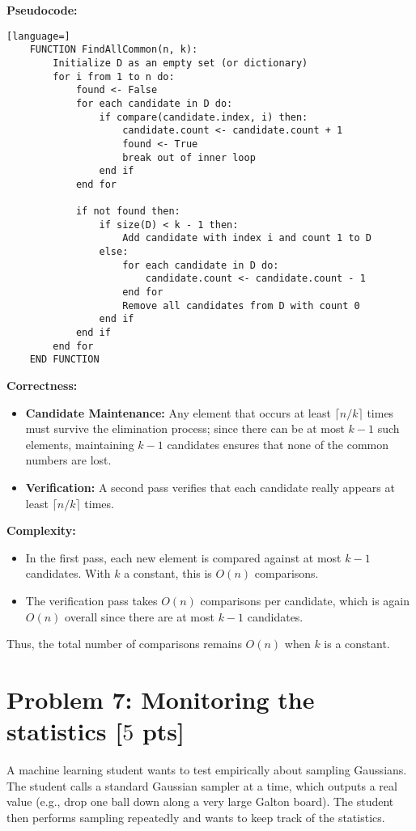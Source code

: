 \documentclass[letterpaper, 11pt]{article}
\newcommand{\1}{\mathds{1}}	%
\theoremstyle{definition}
\newcommand{\problem}[1]{\section*{Problem #1}}
\newenvironment{solution}{{\par\noindent\it Solution.}}{}
\begin{document}
\begin{solution}
    \medskip
    \textbf{Pseudocode:}
    \begin{lstlisting}[language=]
    FUNCTION FindAllCommon(n, k):
        Initialize D as an empty set (or dictionary)
        for i from 1 to n do:
            found <- False
            for each candidate in D do:
                if compare(candidate.index, i) then:
                    candidate.count <- candidate.count + 1
                    found <- True
                    break out of inner loop
                end if
            end for
            
            if not found then:
                if size(D) < k - 1 then:
                    Add candidate with index i and count 1 to D
                else:
                    for each candidate in D do:
                        candidate.count <- candidate.count - 1
                    end for
                    Remove all candidates from D with count 0
                end if
            end if
        end for
    END FUNCTION
    \end{lstlisting}
    
    \medskip
    \textbf{Correctness:}
    \begin{itemize}[itemsep=2mm]
        \item \textbf{Candidate Maintenance:} Any element that occurs at least \(\lceil n/k \rceil\) times must survive the elimination process; since there can be at most \(k-1\) such elements, maintaining \(k-1\) candidates ensures that none of the common numbers are lost.
        \item \textbf{Verification:} A second pass verifies that each candidate really appears at least \(\lceil n/k \rceil\) times.
    \end{itemize}
    
    \textbf{Complexity:}  
    \begin{itemize}[itemsep=2mm]
        \item In the first pass, each new element is compared against at most \(k-1\) candidates. With \(k\) a constant, this is \(O(n)\) comparisons.
        \item The verification pass takes \(O(n)\) comparisons per candidate, which is again \(O(n)\) overall since there are at most \(k-1\) candidates.
    \end{itemize}
    Thus, the total number of comparisons remains \(O(n)\) when \(k\) is a constant.
\end{solution}
\newpage


\problem{7: Monitoring the statistics [$5$ pts]}
A machine learning student wants to test empirically about sampling Gaussians. The student calls a standard Gaussian sampler at a time, which outputs a real value (e.g., drop one ball down along a very large Galton board). The student then performs sampling repeatedly and wants to keep track of the statistics.
\end{document}
